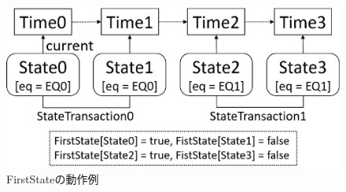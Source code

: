 \documentclass[12pt,a4paper]{jbook}
\begin{document}
\begin{figure}[htb]
\centering
\includegraphics[width=400pt]{./fig/FirstState.eps}
\caption{FirstStateの動作例}
\label{fig:FirstState}
\end{figure}
\color{black}
\end{document}
